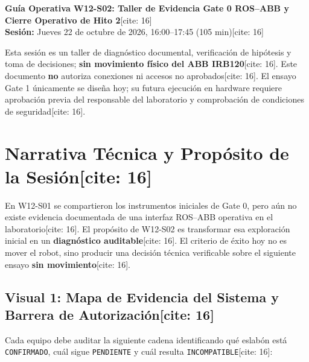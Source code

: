\documentclass[11pt, a4paper]{article}
\begin{document}
\begin{center}
    \Large\textbf{\textcolor{ucbblue}{Guía Operativa W12-S02: Taller de Evidencia Gate 0 ROS–ABB y Cierre Operativo de Hito 2}}[cite: 16]\\[0.15cm]
    \normalsize\textbf{Sesión:} Jueves 22 de octubre de 2026, 16:00–17:45 (105 min)[cite: 16]
\end{center}

\begin{tcolorbox}[colback=red!5, colframe=red!80!black, title=\textbf{Regla Operativa Estricta: NO-GO para Movimiento Físico} {[cite: 16]}, left=2mm, right=2mm, top=1mm, bottom=1mm]
    \small\raggedright
    Esta sesión es un taller de diagnóstico documental, verificación de hipótesis y toma de decisiones; \textbf{sin movimiento físico del ABB IRB120}[cite: 16]. Este documento \textbf{no} autoriza conexiones ni accesos no aprobados[cite: 16]. El ensayo Gate 1 únicamente se diseña hoy; su futura ejecución en hardware requiere aprobación previa del responsable del laboratorio y comprobación de condiciones de seguridad[cite: 16].
\end{tcolorbox}

\section{Narrativa Técnica y Propósito de la Sesión[cite: 16]}
En W12-S01 se compartieron los instrumentos iniciales de Gate 0, pero aún no existe evidencia documentada de una interfaz ROS–ABB operativa en el laboratorio[cite: 16]. El propósito de W12-S02 es transformar esa exploración inicial en un \textbf{diagnóstico auditable}[cite: 16]. El criterio de éxito hoy no es mover el robot, sino producir una decisión técnica verificable sobre el siguiente ensayo \textbf{sin movimiento}[cite: 16].

\subsection*{Visual 1: Mapa de Evidencia del Sistema y Barrera de Autorización[cite: 16]}
Cada equipo debe auditar la siguiente cadena identificando qué eslabón está \texttt{CONFIRMADO}, cuál sigue \texttt{PENDIENTE} y cuál resulta \texttt{INCOMPATIBLE}[cite: 16]:
\end{document}
